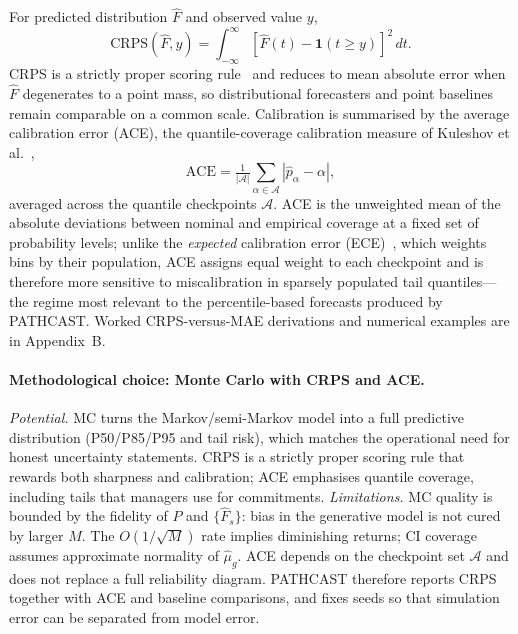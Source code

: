 \begin{definition}[CRPS]
\label{def:crps}
For predicted distribution $\hat{F}$ and observed value $y$,
\begin{equation}
\label{eq:crps}
\text{CRPS}(\hat{F}, y) = \int_{-\infty}^{\infty}
   [\hat{F}(t) - \mathbf{1}(t \geq y)]^2 \, dt.
\end{equation}
CRPS is a strictly proper scoring rule~\cite{gneiting2007strictly} and
reduces to mean absolute error when $\hat{F}$ degenerates to a point mass,
so distributional forecasters and point baselines remain comparable on a
common scale. Calibration is summarised by the average calibration error
(ACE), the quantile-coverage calibration measure of
Kuleshov et al.~\cite{kuleshov2018calibrated},
\begin{equation}
\label{eq:ace}
\text{ACE} = \tfrac{1}{|\mathcal{A}|}
   \sum_{\alpha \in \mathcal{A}}|\hat{p}_\alpha - \alpha|,
\end{equation}
averaged across the quantile checkpoints $\mathcal{A}$. ACE is the
unweighted mean of the absolute deviations between nominal and empirical
coverage at a fixed set of probability levels; unlike the
\emph{expected} calibration error (ECE)~\cite{naeini2015obtaining}, which
weights bins by their population, ACE assigns equal weight to each
checkpoint and is therefore
more sensitive to miscalibration in sparsely populated tail quantiles---the
regime most relevant to the percentile-based forecasts produced by
PATHCAST. Worked CRPS-versus-MAE derivations
and numerical examples are in Appendix~B.
\end{definition}

\paragraph{Methodological choice: Monte Carlo with CRPS and ACE.}
\emph{Potential.} MC turns the Markov/semi-Markov model into a full
predictive distribution (P50/P85/P95 and tail risk), which matches the
operational need for honest uncertainty statements. CRPS is a strictly
proper scoring rule that rewards both sharpness and calibration; ACE
emphasises quantile coverage, including tails that managers use for
commitments.
\emph{Limitations.} MC quality is bounded by the fidelity of $P$ and
$\{\hat{F}_s\}$: bias in the generative model is not cured by larger $M$.
The $O(1/\sqrt{M})$ rate implies diminishing returns; CI coverage assumes
approximate normality of $\hat{\mu}_g$. ACE depends on the checkpoint set
$\mathcal{A}$ and does not replace a full reliability diagram. PATHCAST
therefore reports CRPS together with ACE and baseline comparisons, and
fixes seeds so that simulation error can be separated from model error.


